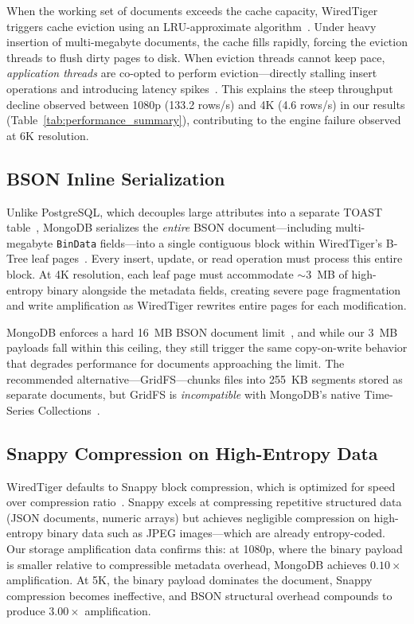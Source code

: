 \documentclass[conference, a4paper]{IEEEtran}
\begin{document}
When the working set of documents exceeds the cache capacity, WiredTiger triggers cache eviction using an LRU-approximate algorithm~\cite{percona_wiredtiger_eviction}. Under heavy insertion of multi-megabyte documents, the cache fills rapidly, forcing the eviction threads to flush dirty pages to disk. When eviction threads cannot keep pace, \emph{application threads} are co-opted to perform eviction---directly stalling insert operations and introducing latency spikes~\cite{percona_wiredtiger_eviction}. This explains the steep throughput decline observed between 1080p (133.2 rows/s) and 4K (4.6 rows/s) in our results (Table~\ref{tab:performance_summary}), contributing to the engine failure observed at 6K resolution.

\subsection{BSON Inline Serialization}
Unlike PostgreSQL, which decouples large attributes into a separate TOAST table~\cite{postgresql_toast_docs}, MongoDB serializes the \emph{entire} BSON document---including multi-megabyte \texttt{BinData} fields---into a single contiguous block within WiredTiger's B-Tree leaf pages~\cite{mongodb_bson_spec}. Every insert, update, or read operation must process this entire block. At 4K resolution, each leaf page must accommodate $\sim$3~MB of high-entropy binary alongside the metadata fields, creating severe page fragmentation and write amplification as WiredTiger rewrites entire pages for each modification.

MongoDB enforces a hard 16~MB BSON document limit~\cite{mongodb_bson_spec}, and while our 3~MB payloads fall within this ceiling, they still trigger the same copy-on-write behavior that degrades performance for documents approaching the limit. The recommended alternative---GridFS---chunks files into 255~KB segments stored as separate documents, but GridFS is \emph{incompatible} with MongoDB's native Time-Series Collections~\cite{mongodb_ts_limitations}.

\subsection{Snappy Compression on High-Entropy Data}
WiredTiger defaults to Snappy block compression, which is optimized for speed over compression ratio~\cite{mongodb_wiredtiger_storage}. Snappy excels at compressing repetitive structured data (JSON documents, numeric arrays) but achieves negligible compression on high-entropy binary data such as JPEG images---which are already entropy-coded. Our storage amplification data confirms this: at 1080p, where the binary payload is smaller relative to compressible metadata overhead, MongoDB achieves $0.10\times$ amplification. At 5K, the binary payload dominates the document, Snappy compression becomes ineffective, and BSON structural overhead compounds to produce $3.00\times$ amplification.
\end{document}
